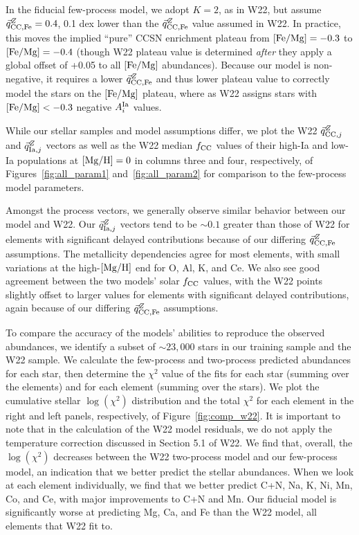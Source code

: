 \documentclass[modern]{aastex631}
\newcommand{\femg}{[{\rm Fe}/{\rm Mg}]}
\newcommand{\mgh}{[{\rm Mg}/{\rm H}]}
\newcommand{\qcc}{\vec{q}_{{\rm CC,}j}^{Z}}
\newcommand{\qccFe}{\vec{q}_{{\rm CC, Fe}}^{Z}}
\newcommand{\qIa}{\vec{q}_{{\rm Ia,}j}^{Z}}
\newcommand{\AIa}{A^{\rm Ia}_{i}}
\newcommand{\fcc}{f_{\rm CC}}
\begin{document}
In the fiducial few-process model, we adopt $K=2$, as in W22, but assume $\qccFe = 0.4$, 0.1 dex lower than the $\qccFe$ value assumed in W22. In practice, this moves the implied ``pure'' CCSN enrichment plateau from $\femg=-0.3$ to $\femg=-0.4$ (though W22 plateau value is determined \textit{after} they apply a global offset of +0.05 to all $\femg$ abundances). Because our model is non-negative, it requires a lower $\qccFe$ and thus lower plateau value to correctly model the stars on the $\femg$ plateau, where as W22 assigns stars with $\femg < -0.3$ negative $\AIa$ values.

While our stellar samples and model assumptions differ, we plot the W22 $\qcc$ and $\qIa$ vectors as well as the W22 median $\fcc$ values of their high-Ia and low-Ia populations at $\mgh=0$ in columns three and four, respectively, of Figures~\ref{fig:all_param1} and~\ref{fig:all_param2} for comparison to the few-process model parameters. 

Amongst the process vectors, we generally observe similar behavior between our model and W22. Our $\qIa$ vectors tend to be $\sim 0.1$ greater than those of W22 for elements with significant delayed contributions because of our differing $\qccFe$ assumptions. The metallicity dependencies agree for most elements, with small variations at the high-$\mgh$ end for O, Al, K, and Ce. We also see good agreement between the two models' solar $\fcc$ values, with the W22 points slightly offset to larger values for elements with significant delayed contributions, again because of our differing $\qccFe$ assumptions.

To compare the accuracy of the models' abilities to reproduce the observed abundances, we identify a subset of $\sim 23,000$ stars in our training sample and the W22 sample. We calculate the few-process and two-process predicted abundances for each star, then determine the $\chi^2$ value of the fits for each star (summing over the elements) and for each element (summing over the stars). We plot the cumulative stellar $\log(\chi^2)$ distribution and the total $\chi^2$ for each element in the right and left panels, respectively, of Figure~\ref{fig:comp_w22}. It is important to note that in the calculation of the W22 model residuals, we do not apply the temperature correction discussed in Section 5.1 of W22. We find that, overall, the $\log(\chi^2)$ decreases between the W22 two-process model and our few-process model, an indication that we better predict the stellar abundances. When we look at each element individually, we find that we better predict C+N, Na, K, Ni, Mn, Co, and Ce, with major improvements to C+N and Mn. Our fiducial model is significantly worse at predicting Mg, Ca, and Fe than the W22 model, all elements that W22 fit to.
\end{document}
